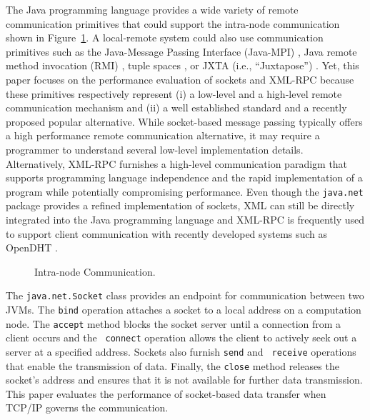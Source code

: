 \documentclass{sig-alternate}
\begin{document}
The Java programming language provides a wide variety of remote
communication primitives that could support the intra-node
communication shown in Figure~\ref{fig:intranode-communication}.  A
local-remote system could also use communication primitives such as
the Java-Message Passing Interface (Java-MPI)
\cite{getov-mpi,judd-mpi-java}, Java remote method invocation (RMI)
\cite{grosso-rmi,maasen-java-rmi,wollrath-java-rmi}, tuple spaces
\cite{arnold-javaspace-rdb,fiedler-per,wells-linda-java-journal}, or
JXTA (i.e., ``Juxtapose'') \cite{oaks-jxta,seigneur-jxta}.  Yet, this
paper focuses on the performance evaluation of sockets and XML-RPC
because these primitives respectively represent (i) a low-level and a
high-level remote communication mechanism and (ii) a well established
standard and a recently proposed popular alternative.  While
socket-based message passing typically offers a high performance
remote communication alternative, it may require a programmer to
understand several low-level implementation details.  Alternatively,
XML-RPC furnishes a high-level communication paradigm that supports
programming language independence and the rapid implementation of a
program while potentially compromising performance.  Even though the
{\tt java.net} package provides a refined implementation of sockets,
XML can still be directly integrated into the Java programming
language \cite{harren-xj} and XML-RPC is frequently used to support
client communication with recently developed systems such as OpenDHT
\cite{rhea-opendht}.

\begin{figure}

\centering

\linethickness{1.1pt}

\vspace*{.3in}

\caption{Intra-node Communication.}

\label{fig:intranode-communication}
\end{figure}

The {\tt java.net.Socket} class provides an endpoint for communication
between two JVMs.  The {\tt bind} operation attaches a socket to a
local address on a computation node.  The {\tt accept} method blocks
the socket server until a connection from a client occurs and the {\tt
  connect} operation allows the client to actively seek out a server
at a specified address.  Sockets also furnish {\tt send} and {\tt
  receive} operations that enable the transmission of data.  Finally,
the {\tt close} method releases the socket's address and ensures that
it is not available for further data transmission.  This paper
evaluates the performance of socket-based data transfer when TCP/IP
governs the communication.
\end{document}
